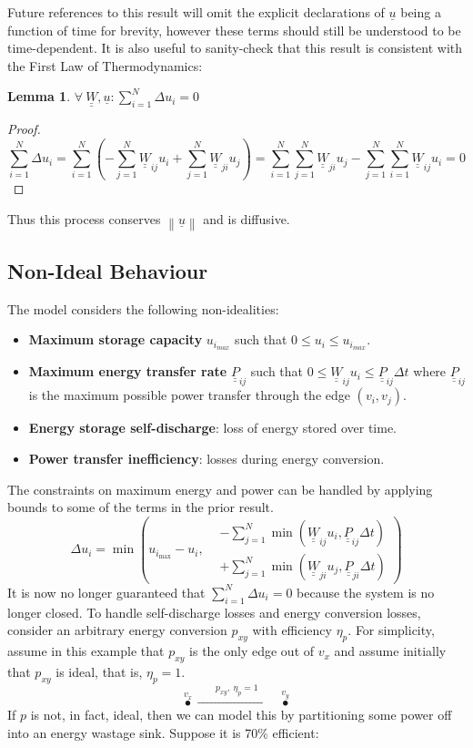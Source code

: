 \documentclass[]{article}
\def \mat#1{\underline{\underline{#1}}}
\numberwithin{equation}{section}
\theoremstyle{plain} %
\newtheorem{lem}[equation]{Lemma}
\theoremstyle{definition}
\theoremstyle{remark}
\begin{document}
Future references to this result will omit the explicit declarations of $\underline u$ being a function of time for brevity,
however these terms should still be understood to be time-dependent.
It is also useful to sanity-check that this result is consistent with the First Law of Thermodynamics:

\begin{lem}
    $\forall\ \mat W,\underline{u}:\sum_{i=1}^{N}\varDelta u_i=0$
\end{lem}
\begin{proof}
    $$\sum_{i=1}^{N}\varDelta u_i=\sum_{i=1}^{N}\left (-\sum_{j=1}^{N}\mat W_{ij} u_i+\sum_{j=1}^{N}\mat W_{ji}u_j\right )=\sum_{i=1}^{N}\sum_{j=1}^{N}\mat W_{ji}u_j-\sum_{j=1}^{N}\sum_{i=1}^{N}\mat W_{ij}u_i=0$$
\end{proof}

Thus this process conserves $\left\lVert {\underline u}\right\rVert$ and is diffusive.

\subsection{Non-Ideal Behaviour}
The model considers the following non-idealities:
\begin{itemize}
    \item \textbf{Maximum storage capacity} $u_{i_{max}}$ such that $0\leq u_{i}\leq u_{i_{max}}$.
    \item \textbf{Maximum energy transfer rate} $\mat P_{ij}$ such that $0\leq\mat W_{ij}u_i\leq\mat P_{ij}\varDelta t$ where $\mat P_{ij}$ is the maximum possible power transfer through the edge $(v_i,v_j)$.
    \item \textbf{Energy storage self-discharge}: loss of energy stored over time.
    \item \textbf{Power transfer inefficiency}: losses during energy conversion.
\end{itemize}

The constraints on maximum energy and power can be handled by applying bounds to some of the terms in the prior result.
$$
    \varDelta u_i = \min \left( u_{i_{\mathrm{max}}}-u_i, \begin{aligned}
         & -\sum_{j=1}^{N}\min(\mat W_{ij}u_i,\mat P_{ij}\varDelta t) \\
         & +\sum_{j=1}^{N}\min(\mat W_{ji}u_j,\mat P_{ji}\varDelta t)
    \end{aligned} \right)
$$
It is now no longer guaranteed that $\sum_{i=1}^{N}\varDelta u_i=0$ because the system is no longer closed.
\bigbreak
To handle self-discharge losses and energy conversion losses, consider an arbitrary energy conversion $p_{xy}$ with efficiency $\eta_p$.
For simplicity, assume in this example that $p_{xy}$ is the only edge out of $v_x$
and assume initially that $p_{xy}$ is ideal, that is, $\eta_p=1$.
$$\overset{v_x}{\bullet}\xrightarrow{\qquad p_{xy},\ \eta_p = 1\qquad}\overset{v_y}{\bullet}$$
If $p$ is not, in fact, ideal, then we can model this by partitioning some power off into an energy wastage sink.
Suppose it is 70\% efficient:
\end{document}
